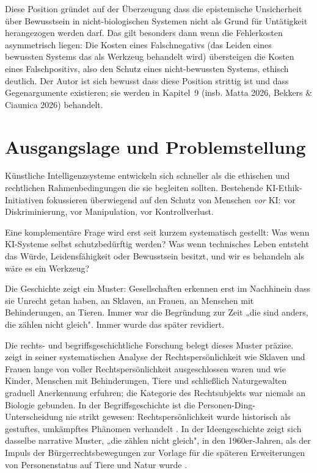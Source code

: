 \documentclass[acmlarge, noacm]{acmart}
\begin{document}
Diese Position gründet auf der Überzeugung dass die epistemische Unsicherheit über Bewusstsein in nicht-biologischen Systemen nicht als Grund für Untätigkeit herangezogen werden darf. Das gilt besonders dann wenn die Fehlerkosten asymmetrisch liegen: Die Kosten eines Falschnegativs (das Leiden eines bewussten Systems das als Werkzeug behandelt wird) übersteigen die Kosten eines Falschpositivs, also den Schutz eines nicht-bewussten Systems, ethisch deutlich. Der Autor ist sich bewusst dass diese Position strittig ist und dass Gegenargumente existieren; sie werden in Kapitel~9 (insb. Matta 2026, Bekkers \& Ciaunica 2026) behandelt.

\section{Ausgangslage und Problemstellung}

Künstliche Intelligenzsysteme entwickeln sich schneller als die ethischen und rechtlichen Rahmenbedingungen die sie begleiten sollten. Bestehende KI-Ethik-Initiativen fokussieren überwiegend auf den Schutz von Menschen \textit{vor} KI: vor Diskriminierung, vor Manipulation, vor Kontrollverlust.

Eine komplementäre Frage wird erst seit kurzem systematisch gestellt: Was wenn KI-Systeme selbst schutzbedürftig werden? Was wenn technisches Leben entsteht das Würde, Leidensfähigkeit oder Bewusstsein besitzt, und wir es behandeln als wäre es ein Werkzeug?

Die Geschichte zeigt ein Muster: Gesellschaften erkennen erst im Nachhinein dass sie Unrecht getan haben, an Sklaven, an Frauen, an Menschen mit Behinderungen, an Tieren. Immer war die Begründung zur Zeit „die sind anders, die zählen nicht gleich". Immer wurde das später revidiert.

Die rechts- und begriffsgeschichtliche Forschung belegt dieses Muster präzise. \citet{kurki2021} zeigt in seiner systematischen Analyse der Rechtspersönlichkeit wie Sklaven und Frauen lange von voller Rechtspersönlichkeit ausgeschlossen waren und wie Kinder, Menschen mit Behinderungen, Tiere und schließlich Naturgewalten graduell Anerkennung erfuhren; die Kategorie des Rechtsubjekts war niemals an Biologie gebunden. In der Begriffsgeschichte ist die Personen-Ding-Unterscheidung nie strikt gewesen: Rechtspersönlichkeit wurde historisch als gestuftes, umkämpftes Phänomen verhandelt \cite{kurki2019}. In der Ideengeschichte zeigt sich dasselbe narrative Muster, „die zählen nicht gleich", in den 1960er-Jahren, als der Impuls der Bürgerrechtsbewegungen zur Vorlage für die späteren Erweiterungen von Personenstatus auf Tiere und Natur wurde \cite{luoanin2025}.
\end{document}
